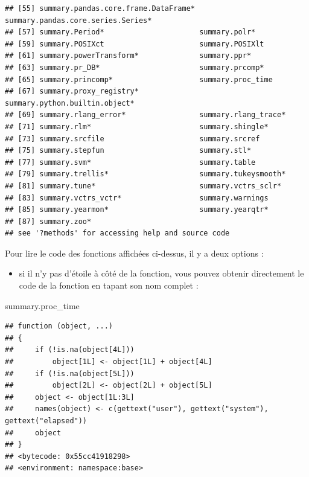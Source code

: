 \documentclass[
]{book}
\newenvironment{Shaded}{\begin{snugshade}}{\end{snugshade}}
\newcommand{\NormalTok}[1]{#1}
\providecommand{\tightlist}{%
  \setlength{\itemsep}{0pt}\setlength{\parskip}{0pt}}
\theoremstyle{definition}
\theoremstyle{definition}
\theoremstyle{definition}
\theoremstyle{definition}
\theoremstyle{remark}
\begin{document}
\begin{verbatim}
## [55] summary.pandas.core.frame.DataFrame* summary.pandas.core.series.Series*  
## [57] summary.Period*                      summary.polr*                       
## [59] summary.POSIXct                      summary.POSIXlt                     
## [61] summary.powerTransform*              summary.ppr*                        
## [63] summary.pr_DB*                       summary.prcomp*                     
## [65] summary.princomp*                    summary.proc_time                   
## [67] summary.proxy_registry*              summary.python.builtin.object*      
## [69] summary.rlang_error*                 summary.rlang_trace*                
## [71] summary.rlm*                         summary.shingle*                    
## [73] summary.srcfile                      summary.srcref                      
## [75] summary.stepfun                      summary.stl*                        
## [77] summary.svm*                         summary.table                       
## [79] summary.trellis*                     summary.tukeysmooth*                
## [81] summary.tune*                        summary.vctrs_sclr*                 
## [83] summary.vctrs_vctr*                  summary.warnings                    
## [85] summary.yearmon*                     summary.yearqtr*                    
## [87] summary.zoo*                        
## see '?methods' for accessing help and source code
\end{verbatim}

Pour lire le code des fonctions affichées ci-dessus, il y a deux options :

\begin{itemize}
\tightlist
\item
  si il n'y pas d'étoile à côté de la fonction, vous pouvez obtenir directement le code de la fonction en tapant son nom complet :
\end{itemize}

\begin{Shaded}
\begin{Highlighting}[]
\NormalTok{summary.proc\_time}
\end{Highlighting}
\end{Shaded}

\begin{verbatim}
## function (object, ...) 
## {
##     if (!is.na(object[4L])) 
##         object[1L] <- object[1L] + object[4L]
##     if (!is.na(object[5L])) 
##         object[2L] <- object[2L] + object[5L]
##     object <- object[1L:3L]
##     names(object) <- c(gettext("user"), gettext("system"), gettext("elapsed"))
##     object
## }
## <bytecode: 0x55cc41918298>
## <environment: namespace:base>
\end{verbatim}
\end{document}

